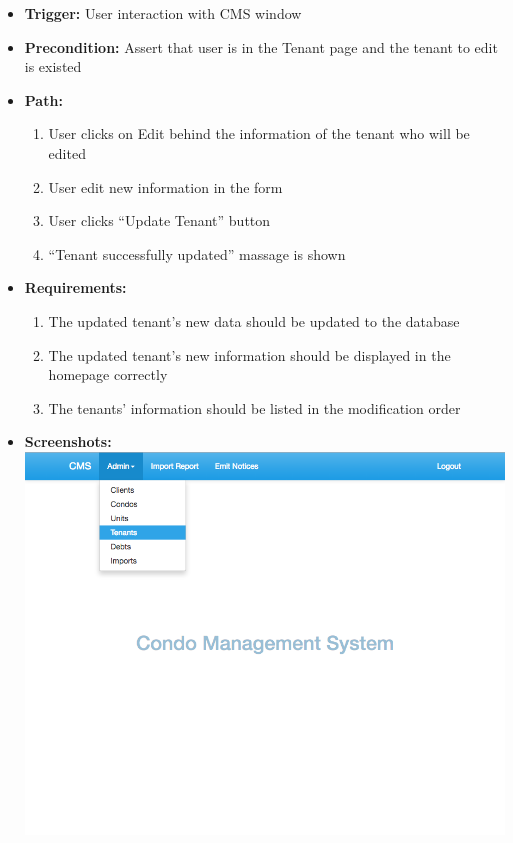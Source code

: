 \begin{itemize}
  \item[] \textbf{Trigger:} User interaction with CMS window
  \item[] \textbf{Precondition:} Assert that user is in the Tenant page and the tenant to edit is existed
  \item[] \textbf{Path:}
    \begin{enumerate}
      \item User clicks on Edit behind the information of the tenant who will be edited
      \item User edit new information in the form
      \item User clicks ``Update Tenant'' button
      \item ``Tenant successfully updated'' massage is shown
    \end{enumerate}
  \item[] \textbf{Requirements:}
    \begin{enumerate}
      \item The updated tenant’s new data should be updated to the database
      \item The updated tenant’s new information should be displayed in the homepage correctly
      \item The tenants’ information should be listed in the modification order
    \end{enumerate}
  \item[] \textbf{Screenshots:}\\
    \includegraphics[scale=0.25]{./images/ss/tenant/edit/1.png}

\end{itemize}
